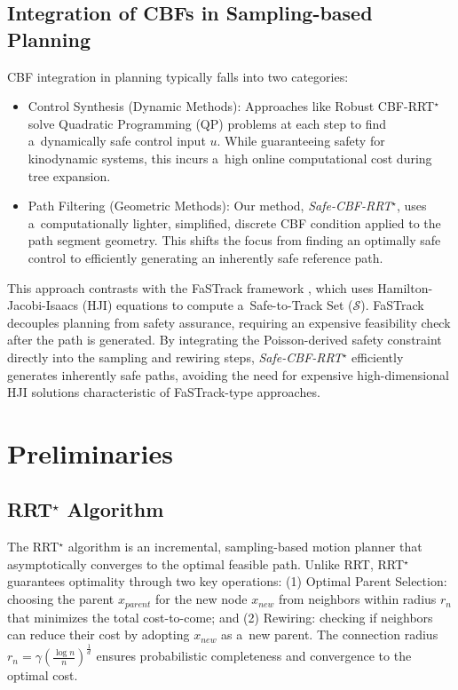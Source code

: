 \documentclass[letterpaper, 10 pt, conference]{ieeeconf}
\begin{document}
\subsection{Integration of CBFs in Sampling-based Planning}
CBF integration in planning typically falls into two categories:

\begin{itemize}
    \item Control Synthesis (Dynamic Methods): Approaches like Robust CBF-RRT$^\star$ \cite{Yang_2019} solve Quadratic Programming (QP) problems at each step to find a~dynamically safe control input $u$. While guaranteeing safety for kinodynamic systems, this incurs a~high online computational cost during tree expansion.
    \item Path Filtering (Geometric Methods): Our method, \emph{Safe-CBF-RRT$^\star$}, uses a~computationally lighter, simplified, discrete CBF condition applied to the path segment geometry. This shifts the focus from finding an optimally safe control to efficiently generating an inherently safe reference path.
\end{itemize}

This approach contrasts with the FaSTrack framework \cite{Chen_2021}, which uses Hamilton-Jacobi-Isaacs (HJI) equations to compute a~Safe-to-Track Set ($\mathcal{S}$). FaSTrack decouples planning from safety assurance, requiring an expensive feasibility check after the path is generated. By integrating the Poisson-derived safety constraint directly into the sampling and rewiring steps, \textit{Safe-CBF-RRT$^\star$} efficiently generates inherently safe paths, avoiding the need for expensive high-dimensional HJI solutions characteristic of FaSTrack-type approaches.

\section{Preliminaries}
\subsection{RRT$^\star$ Algorithm}
The RRT$^\star$ algorithm \cite{karaman2011samplingbasedalgorithmsoptimalmotion} is an incremental, sampling-based motion planner that asymptotically converges to the optimal feasible path. Unlike RRT, RRT$^\star$ guarantees optimality through two key operations: (1) Optimal Parent Selection: choosing the parent $x_{parent}$ for the new node $x_{new}$ from neighbors within radius $r_n$ that minimizes the total cost-to-come; and (2) Rewiring: checking if neighbors can reduce their cost by adopting $x_{new}$ as a~new parent. The connection radius $r_{n} = \gamma(\frac{\log{n}}{n})^{\frac{1}{d}}$ ensures probabilistic completeness and convergence to the optimal cost.
\end{document}
